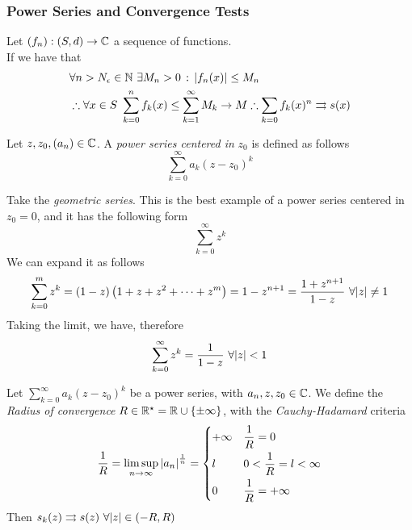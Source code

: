 \documentclass[../complete.tex]{subfiles}
\begin{document}
\subsubsection{Power Series and Convergence Tests}
\begin{thm}
	Let $(f_n):(S,d)\to\mathbb{C}$ a sequence of functions.\\
	If we have that
	\begin{equation*}
		\begin{aligned}
			&\forall n>N_\epsilon\in\N\ \exists M_n>0\st\abs{f_n(x)}\le M_n\\
			&\therefore\forall x\in S\ \sum_{k=0}^nf_k(x)\le\sum_{k=1}^{\infty}M_k\to M\therefore\sum_{k=0}f_k(x)^n\tto s(x)
		\end{aligned}
	\end{equation*}
\end{thm}
\begin{dfn}
	Let $z,z_0,(a_n)\in\mathbb{C}$. A \textit{power series centered in} $z_0$ is defined as follows
	\begin{equation}
		\sum_{k=0}^\infty a_k(z-z_0)^k
		\label{eq:powerseries}
	\end{equation}
\end{dfn}
\begin{eg}
	Take the \textit{geometric series}. This is the best example of a power series centered in $z_0=0$, and it has the following form
	\begin{equation}
		\sum_{k=0}^\infty z^k
		\label{eq:geometricpw}
	\end{equation}
	We can expand it as follows
	\begin{equation}
		\sum_{k=0}^{m}z^k=(1-z)\left( 1+z+z^2+\cdots+z^m \right)=1-z^{n+1}=\frac{1+z^{n+1}}{1-z}\ \forall\abs{z}\ne1
		\label{eq:geometricseries}
	\end{equation}
	Taking the limit, we have, therefore
	\begin{equation}
		\sum_{k=0}^{\infty}z^k=\frac{1}{1-z}\ \forall\abs{z}<1
		\label{eq:geometricseriessum}
	\end{equation}
\end{eg}
\begin{thm}
	Let $\sum_{k=0}^{\infty}a_k(z-z_0)^k$ be a power series, with $a_n,z,z_0\in\mathbb{C}$. We define the \textit{Radius of convergence} $R\in\mathbb{R}^{\star}=\mathbb{R}\cup\{\pm\infty\}$, with the \textit{Cauchy-Hadamard} criteria
	\begin{equation}
		\frac{1}{R}=\limsup_{n\to\infty}\abs{a_n}^{\frac{1}{n}}=\begin{dcases}+\infty&\frac{1}{R}=0\\l&0<\frac{1}{R}=l<\infty\\0&\frac{1}{R}=+\infty\end{dcases}
		\label{eq:cauchyhadamard}
	\end{equation}
	Then $s_k(z)\tto s(z)\ \forall\abs{z}\in(-R,R)$
\end{thm}
\end{document}
